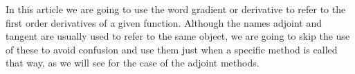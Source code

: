 In this article we are going to use the word gradient or derivative to refer to the first order derivatives of a given function. 
Although the names adjoint and tangent are usually used to refer to the same object, we are going to skip the use of these to avoid confusion and use them just when a specific method is called that way, as we will see for the case of the adjoint methods. 